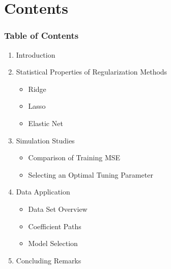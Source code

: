 \section{Contents}%
\begin{frame}[fragile]
    \frametitle{Table of Contents}
    \begin{enumerate}
        \item {Introduction}
        \item {Statistical Properties of Regularization Methods}
            \begin{itemize}
                \item {Ridge}
                \item {Lasso}
                \item {Elastic Net}
            \end{itemize}
        \item {Simulation Studies}
            \begin{itemize}
                \item Comparison of Training MSE 
                \item Selecting an Optimal Tuning Parameter
            \end{itemize}
        \item {Data Application}
            \begin{itemize}
                \item Data Set Overview
                \item Coefficient Paths
                \item Model Selection
            \end{itemize}
        \item {Concluding Remarks}
    \end{enumerate}
\end{frame}

